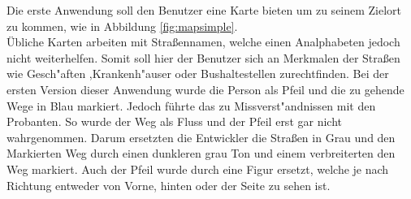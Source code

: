 Die erste Anwendung soll den Benutzer eine Karte bieten um zu seinem Zielort zu kommen, wie in Abbildung \ref{fig:mapsimple}.\\
Übliche Karten arbeiten mit Straßennamen, welche einen Analphabeten jedoch nicht weiterhelfen. Somit soll hier der Benutzer sich an Merkmalen der Straßen wie Gesch"aften ,Krankenh"auser oder Bushaltestellen zurechtfinden.
Bei der ersten Version dieser Anwendung wurde die Person als Pfeil und die zu gehende Wege in Blau markiert. Jedoch führte das zu Missverst"andnissen mit den Probanten. So wurde der Weg als Fluss und der Pfeil erst gar nicht wahrgenommen. Darum ersetzten die Entwickler die Straßen in Grau und den Markierten Weg durch einen dunkleren grau Ton und einem verbreiterten den Weg markiert.
Auch der Pfeil wurde durch eine Figur ersetzt, welche je nach Richtung entweder von Vorne, hinten oder der Seite zu sehen ist.

